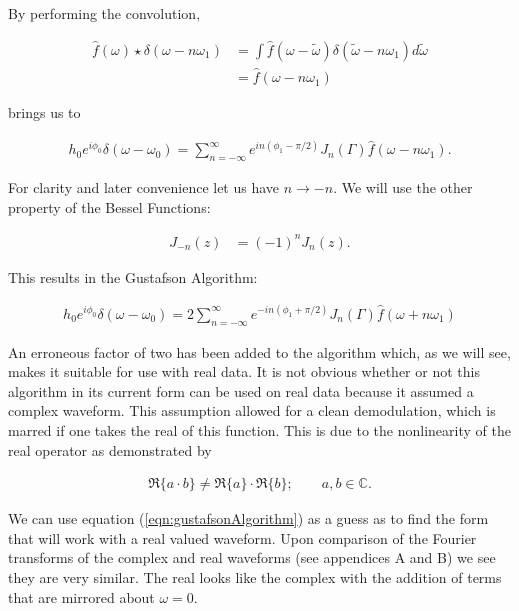 \documentclass[onecolumn, groupedaddress, 10pt]{revtex4-1}
\begin{document}
By performing the convolution,

\begin{align}
\hat{f}(\omega) \star \delta (\omega - n\omega_1) 
&= \int \hat{f}(\omega - \widetilde{\omega}) \delta(\widetilde{\omega} - n\omega_1) d\widetilde{\omega}			\\
&= \hat{f} (\omega - n\omega_1)
\end{align}

brings us to

\begin{align}
h_0 e^{i\phi_0} \delta (\omega - \omega_0) = \sum_{n=-\infty}^{\infty} e^{in(\phi_1-\pi/2)} J_n(\Gamma) \hat{f} (\omega - n\omega_1).
\end{align}

For clarity and later convenience let us have $n\to -n$.  We will use the other property of the Bessel Functions: \cite{}

\begin{align}
J_{-n} (z) &= (-1)^n J_n(z).
\end{align}

This results in the Gustafson Algorithm:

\begin{align}
\label{eqn:gustafsonAlgorithm}
\boxed{h_0 e^{i\phi_0} \delta (\omega - \omega_0) = 2 \sum_{n=-\infty}^{\infty} e^{-in(\phi_1+\pi/2)} J_n(\Gamma) \hat{f} (\omega + n\omega_1)}
\end{align}


An erroneous factor of two has been added to the algorithm which, as we will see, makes it suitable for use with real data.  It is not obvious whether or not this algorithm in its current form can be used on real data because it assumed a complex waveform.  This assumption allowed for a clean demodulation, which is marred if one takes the real of this function.  This is due to the nonlinearity of the real operator as demonstrated by

\begin{align}
\Re \{ a \cdot b \} \neq \Re \{ a \} \cdot \Re \{ b \}; \qquad a,b \in \mathds{C}.
\end{align}

We can use equation (\ref{eqn:gustafsonAlgorithm}) as a guess as to find the form that will work with a real valued waveform.  Upon comparison of the Fourier transforms of the complex and real waveforms (see appendices A and B) we see they are very similar.  The real looks like the complex with the addition of terms that are mirrored about $\omega=0$.
\end{document}
